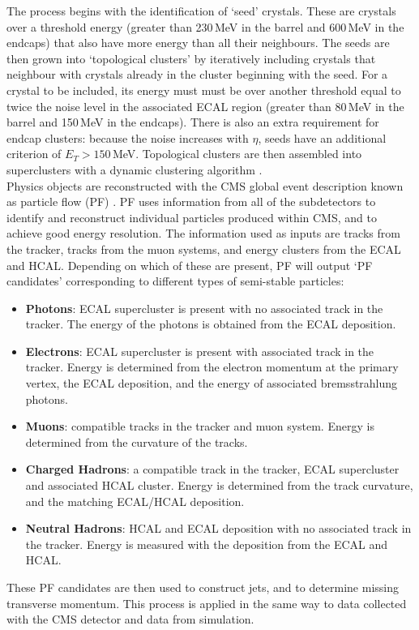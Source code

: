 The process \cite{CMSEcalTDR} begins with the identification of `seed' crystals. These are crystals over a threshold energy (greater than 230\,MeV in the barrel and 600\,MeV in the endcaps) that also have more energy than all their neighbours.
The seeds are then grown into `topological clusters' by iteratively including crystals that neighbour with crystals already in the cluster beginning with the seed.
For a crystal to be included, its energy must must be over another threshold equal to twice the noise level in the associated ECAL region (greater than 80\,MeV in the barrel and 150\,MeV in the endcaps).
There is also an extra requirement for endcap clusters: because the noise increases with $\eta$, seeds have an additional criterion of $E_T > 150$\,MeV.
Topological clusters are then assembled into superclusters with a dynamic clustering algorithm \cite{CMSEcalTDR}.
\\

Physics objects are reconstructed with the CMS global event description known as particle flow (PF) \cite{ParticleFlow}.
PF uses information from all of the subdetectors to identify and reconstruct individual particles produced within CMS, and to achieve good energy resolution.
The information used as inputs are tracks from the tracker, tracks from the muon systems, and energy clusters from the ECAL and HCAL. Depending on which of these are present, PF will output `PF candidates' corresponding to different types of semi-stable particles:
\begin{itemize}[noitemsep]
    \item \textbf{Photons}: ECAL supercluster is present with no associated track in the tracker. 
                            The energy of the photons is obtained from the ECAL deposition. 
    \item \textbf{Electrons}: ECAL supercluster is present with associated track in the tracker. 
                              Energy is determined from the electron momentum at the primary vertex, the ECAL deposition, and the energy of associated bremsstrahlung photons. 
    \item \textbf{Muons}: compatible tracks in the tracker and muon system. 
                          Energy is determined from the curvature of the tracks. 
    \item \textbf{Charged Hadrons}: a compatible track in the tracker, ECAL supercluster and associated HCAL cluster. 
                                    Energy is determined from the track curvature, and the matching ECAL/HCAL deposition.
    \item \textbf{Neutral Hadrons}: HCAL and ECAL deposition with no associated track in the tracker. 
                                    Energy is measured with the deposition from the ECAL and HCAL. 
\end{itemize}
These PF candidates are then used to construct jets, and to determine missing transverse momentum.
This process is applied in the same way to data collected with the CMS detector and data from simulation.


